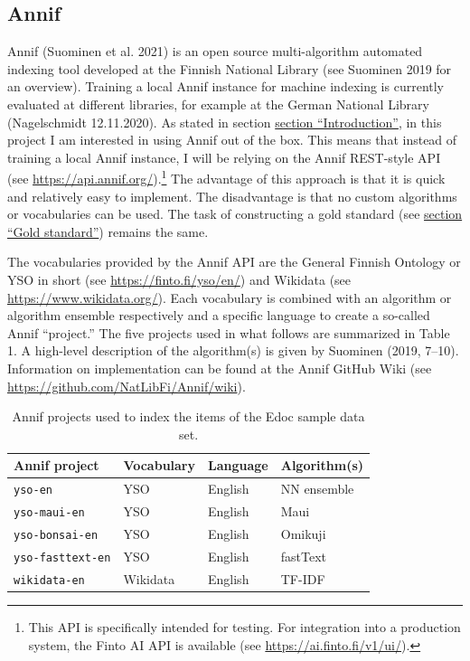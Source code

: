 \hypertarget{annif}{%
\subsection{Annif}\label{annif}}

Annif (Suominen et al. 2021) is an open source multi-algorithm automated
indexing tool developed at the Finnish National Library (see Suominen
2019 for an overview). Training a local Annif instance for machine
indexing is currently evaluated at different libraries, for example at
the German National Library (Nagelschmidt 12.11.2020). As stated in
section \protect\hyperlink{introduction}{section ``Introduction''}, in
this project I am interested in using Annif out of the box. This means
that instead of training a local Annif instance, I will be relying on
the Annif REST-style API (see \url{https://api.annif.org/}).\footnote{This
  API is specifically intended for testing. For integration into a
  production system, the Finto AI API is available (see
  \url{https://ai.finto.fi/v1/ui/}).} The advantage of this approach is
that it is quick and relatively easy to implement. The disadvantage is
that no custom algorithms or vocabularies can be used. The task of
constructing a gold standard (see
\protect\hyperlink{gold-standard}{section ``Gold standard''}) remains
the same.

The vocabularies provided by the Annif API are the General Finnish
Ontology or YSO in short (see \url{https://finto.fi/yso/en/}) and
Wikidata (see \url{https://www.wikidata.org/}). Each vocabulary is
combined with an algorithm or algorithm ensemble respectively and a
specific language to create a so-called Annif ``project.'' The five
projects used in what follows are summarized in Table 1. A high-level
description of the algorithm(s) is given by Suominen (2019, 7--10).
Information on implementation can be found at the Annif GitHub Wiki (see
\url{https://github.com/NatLibFi/Annif/wiki}).

\begin{table}[]
\centering
\begin{tabular}{llll}
Annif project   & Vocabulary & Language & Algorithm(s)   \\ \hline
\texttt{yso-en}  & YSO        & English  & NN ensemble \\
\texttt{yso-maui-en}     & YSO        & English  & Maui        \\
\texttt{yso-bonsai-en}   & YSO        & English  & Omikuji     \\
\texttt{yso-fasttext-en} & YSO        & English  & fastText    \\
\texttt{wikidata-en}     & Wikidata   & English  & TF-IDF     
\end{tabular}
\caption{Annif projects used to index the items of the Edoc sample data set.}
\label{tab:my-table}
\end{table}

